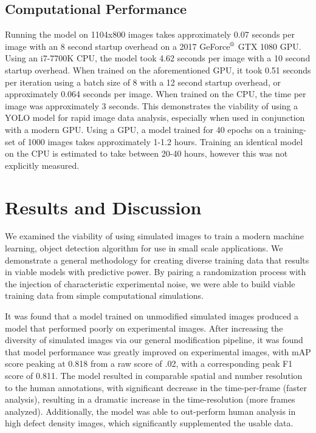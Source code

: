 \documentclass[twoside,twocolumn,9pt]{article}
\begin{document}
\subsection{Computational Performance}

Running the model on 1104x800 images takes approximately 0.07 seconds per image with an 8 second startup overhead on a 2017 GeForce$^{\tiny{\text{\textregistered}}}$ GTX 1080 GPU. Using an i7-7700K CPU, the model took 4.62 seconds per image with a 10 second startup overhead. When trained on the aforementioned GPU, it took 0.51 seconds per iteration using a batch size of 8 with a 12 second startup overhead, or approximately 0.064 seconds per image. When trained on the CPU, the time per image was approximately 3 seconds.   %
This demonstrates the viability of using a YOLO model for rapid image data analysis, especially when used in conjunction with a modern GPU. Using a GPU, a model trained for 40 epochs on a training-set of 1000 images takes approximately 1-1.2 hours.
Training an identical model on the CPU is estimated to take between 20-40 hours, however this was not explicitly measured.

\section{Results and Discussion}
We examined the viability of using simulated images to train a modern machine learning, object detection algorithm for use in small scale applications. We demonstrate a general methodology for creating diverse training data that results in viable models with predictive power. By pairing a randomization process with the injection of characteristic experimental noise, we were able to build viable training data from simple computational simulations. 

It was found that a model trained on unmodified simulated images produced a model that performed poorly on experimental images. After increasing the diversity of simulated images via our general modification pipeline, it was found that model performance was greatly improved on experimental images, with mAP score peaking at 0.818 from a raw score of .02, with a corresponding peak F1 score of 0.811.
The model resulted in comparable spatial and number resolution to the human annotations, with significant decrease in the time-per-frame (faster analysis), resulting in a dramatic increase in the time-resolution (more frames analyzed). Additionally, the model was able to out-perform human analysis in high defect density images, which significantly supplemented the usable data.
\end{document}
